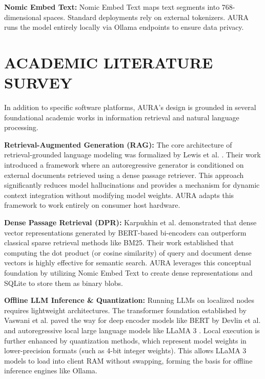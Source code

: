 \documentclass[12pt,a4paper]{report}
\begin{document}
\vspace{0.3cm}
\noindent\textbf{Nomic Embed Text:} Nomic Embed Text maps text segments into 768-dimensional spaces. Standard deployments rely on external tokenizers. AURA runs the model entirely locally via Ollama endpoints to ensure data privacy.

\section{ACADEMIC LITERATURE SURVEY}
In addition to specific software platforms, AURA's design is grounded in several foundational academic works in information retrieval and natural language processing.

\noindent\textbf{Retrieval-Augmented Generation (RAG):} The core architecture of retrieval-grounded language modeling was formalized by Lewis et al. \cite{rag_paper}. Their work introduced a framework where an autoregressive generator is conditioned on external documents retrieved using a dense passage retriever. This approach significantly reduces model hallucinations and provides a mechanism for dynamic context integration without modifying model weights. AURA adapts this framework to work entirely on consumer host hardware.

\vspace{0.3cm}
\noindent\textbf{Dense Passage Retrieval (DPR):} Karpukhin et al. \cite{dpr_paper} demonstrated that dense vector representations generated by BERT-based bi-encoders can outperform classical sparse retrieval methods like BM25. Their work established that computing the dot product (or cosine similarity) of query and document dense vectors is highly effective for semantic search. AURA leverages this conceptual foundation by utilizing Nomic Embed Text to create dense representations and SQLite to store them as binary blobs.

\vspace{0.3cm}
\noindent\textbf{Offline LLM Inference \& Quantization:} Running LLMs on localized nodes requires lightweight architectures. The transformer foundation established by Vaswani et al. \cite{vaswani} paved the way for deep encoder models like BERT by Devlin et al. \cite{offline_llm} and autoregressive local large language models like LLaMA 3 \cite{llama3}. Local execution is further enhanced by quantization methods, which represent model weights in lower-precision formats (such as 4-bit integer weights). This allows LLaMA 3 models to load into client RAM without swapping, forming the basis for offline inference engines like Ollama.
\end{document}
